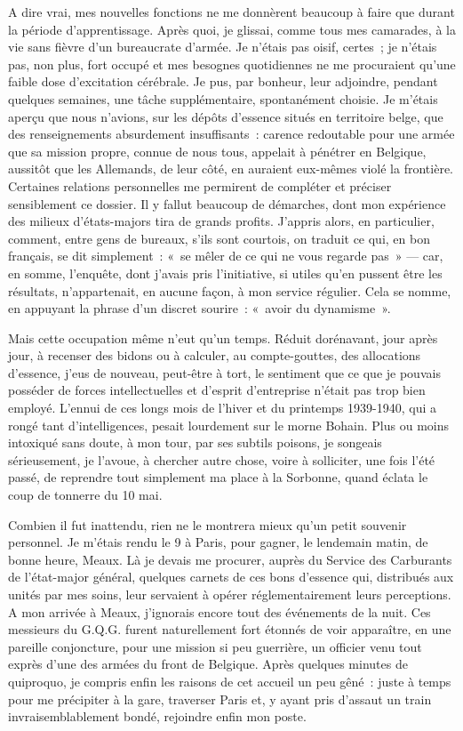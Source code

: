 \documentclass[french,twoside]{book} %
\begin{document}
A dire vrai, mes nouvelles fonctions ne me donnèrent beaucoup à faire que durant la période d’apprentissage. Après quoi, je glissai, comme tous mes camarades, à la vie sans fièvre d’un bureaucrate d’armée. Je n’étais pas oisif, certes ; je n’étais pas, non plus, fort occupé et mes besognes quotidiennes ne me procuraient qu’une faible dose d’excitation cérébrale. Je pus, par bonheur, leur adjoindre, pendant quelques semaines, une tâche supplémentaire, spontanément choisie. Je m’étais aperçu que nous n’avions, sur les dépôts d’essence situés en territoire belge, que des renseignements absurdement insuffisants : carence redoutable pour une armée que sa mission propre, connue de nous tous, appelait à pénétrer en Belgique, aussitôt que les Allemands, de leur côté, en auraient eux-mêmes violé la frontière. Certaines relations personnelles me permirent de compléter et préciser sensiblement ce dossier. Il y fallut beaucoup de démarches, dont mon expérience des milieux d’états-majors tira de grands profits. J’appris alors, en particulier, comment, entre gens de bureaux, s’ils sont courtois, on traduit ce qui, en bon français, se dit simplement : « se mêler de ce qui ne vous regarde pas » — car, en somme, l’enquête, dont j’avais pris l’initiative, si utiles qu’en pussent être les résultats, n’appartenait, en aucune façon, à mon service régulier. Cela se nomme, en appuyant la phrase d’un discret sourire : « avoir du dynamisme ».\par
Mais cette occupation même n’eut qu’un temps. Réduit dorénavant, jour après jour, à recenser des   bidons ou à calculer, au compte-gouttes, des allocations d’essence, j’eus de nouveau, peut-être à tort, le sentiment que ce que je pouvais posséder de forces intellectuelles et d’esprit d’entreprise n’était pas trop bien employé. L’ennui de ces longs mois de l’hiver et du printemps 1939-1940, qui a rongé tant d’intelligences, pesait lourdement sur le morne Bohain. Plus ou moins intoxiqué sans doute, à mon tour, par ses subtils poisons, je songeais sérieusement, je l’avoue, à chercher autre chose, voire à solliciter, une fois l’été passé, de reprendre tout simplement ma place à la Sorbonne, quand éclata le coup de tonnerre du 10 mai.\par
Combien il fut inattendu, rien ne le montrera mieux qu’un petit souvenir personnel. Je m’étais rendu le 9 à Paris, pour gagner, le lendemain matin, de bonne heure, Meaux. Là je devais me procurer, auprès du Service des Carburants de l’état-major général, quelques carnets de ces bons d’essence qui, distribués aux unités par mes soins, leur servaient à opérer réglementairement leurs perceptions. A mon arrivée à Meaux, j’ignorais encore tout des événements de la nuit. Ces messieurs du G.Q.G. furent naturellement fort étonnés de voir apparaître, en une pareille conjoncture, pour une mission si peu guerrière, un officier venu tout exprès d’une des armées du front de Belgique. Après quelques minutes de quiproquo, je compris enfin les raisons de cet accueil un peu gêné : juste à temps pour me précipiter à la gare, traverser Paris et, y ayant pris d’assaut un train invraisemblablement bondé, rejoindre enfin mon poste.\par
\end{document}
